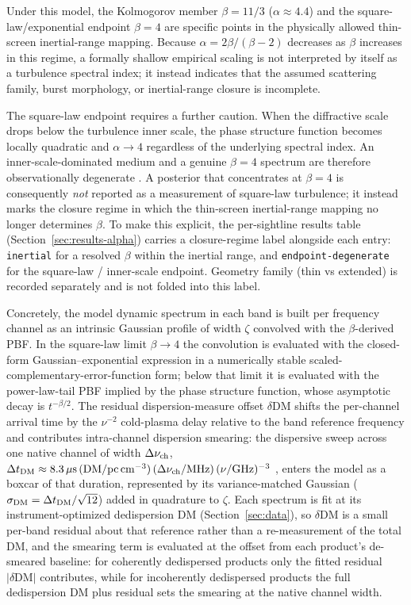 Under this model, the Kolmogorov member $\beta=11/3$ ($\alpha\approx4.4$) and
the square-law/exponential endpoint $\beta=4$ are specific points in the
physically allowed thin-screen inertial-range mapping. Because
$\alpha=2\beta/(\beta-2)$ decreases as $\beta$ increases in this regime, a
formally shallow empirical scaling is not interpreted by itself as a turbulence
spectral index; it instead indicates that the assumed scattering family, burst
morphology, or inertial-range closure is incomplete.

The square-law endpoint requires a further caution. When the diffractive scale drops below
the turbulence inner scale, the phase structure function becomes locally
quadratic and $\alpha\to4$ regardless of the underlying spectral index. An
inner-scale-dominated medium and a genuine $\beta=4$ spectrum are therefore
observationally degenerate \citep{Cordes2016, Cordes2025}. A posterior that
concentrates at $\beta=4$ is consequently \emph{not} reported as a measurement
of square-law turbulence; it instead marks the closure regime in which the
thin-screen inertial-range mapping no longer determines $\beta$. To make this
explicit, the per-sightline results table (Section~\ref{sec:results-alpha})
carries a closure-regime label alongside each entry: \texttt{inertial} for a resolved $\beta$ within the inertial range, and \texttt{endpoint-degenerate}
for the square-law / inner-scale endpoint. Geometry family (thin vs
extended) is recorded separately and is not folded into this label.

Concretely, the model dynamic spectrum in each band is built per frequency
channel as an intrinsic Gaussian profile of width $\zeta$ convolved with the
$\beta$-derived PBF. In the square-law limit $\beta\to4$ the convolution is
evaluated with the closed-form Gaussian--exponential expression in a
numerically stable scaled-complementary-error-function form; below that limit
it is evaluated with the power-law-tail PBF implied by the phase structure
function, whose asymptotic decay is $t^{-\beta/2}$. The residual
dispersion-measure offset $\delta\mathrm{DM}$ shifts the per-channel arrival
time by the $\nu^{-2}$ cold-plasma delay relative to the band reference
frequency and contributes intra-channel dispersion smearing: the dispersive
sweep across one native channel of width $\Delta\nu_{\rm ch}$,
$\Delta t_{\rm DM} \approx 8.3\,\mu\mathrm{s}\,
(\mathrm{DM}/\mathrm{pc\,cm^{-3}})\,(\Delta\nu_{\rm ch}/\mathrm{MHz})\,
(\nu/\mathrm{GHz})^{-3}$ \citep{LorimerKramer2004}, enters the model as a
boxcar of that duration, represented by its variance-matched Gaussian
($\sigma_{\rm DM}=\Delta t_{\rm DM}/\sqrt{12}$) added in quadrature to
$\zeta$. Each spectrum is fit at its instrument-optimized dedispersion DM
(Section~\ref{sec:data}), so $\delta\mathrm{DM}$ is a small per-band residual
about that reference rather than a re-measurement of the total DM, and the
smearing term is evaluated at the offset from each product's de-smeared
baseline: for coherently dedispersed products only the fitted residual
$|\delta\mathrm{DM}|$ contributes, while for incoherently dedispersed
products the full dedispersion DM plus residual sets the smearing at the
native channel width.

